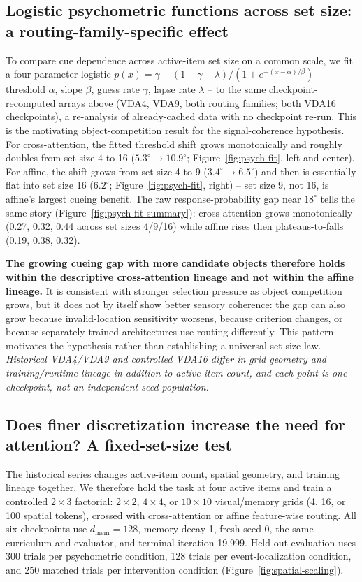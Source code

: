 \documentclass[10pt]{article}
\newcommand{\note}[1]{\textcolor{NoteGray}{\textit{#1}}}
\begin{document}
\subsection{Logistic psychometric functions across set size: a routing-family-specific effect}\label{sec:psychometric-fits}
To compare cue dependence across active-item set size on a common scale, we fit a four-parameter logistic $p(x)=\gamma+(1-\gamma-\lambda)/(1+e^{-(x-\alpha)/\beta})$ -- threshold $\alpha$, slope $\beta$, guess rate $\gamma$, lapse rate $\lambda$ -- to the same checkpoint-recomputed arrays above (VDA4, VDA9, both routing families; both VDA16 checkpoints), a re-analysis of already-cached data with no checkpoint re-run. This is the motivating object-competition result for the signal-coherence hypothesis. For cross-attention, the fitted threshold shift grows monotonically and roughly doubles from set size 4 to 16 ($5.3^\circ\to10.9^\circ$; Figure~\ref{fig:psych-fit}, left and center). For affine, the shift grows from set size 4 to 9 ($3.4^\circ\to6.5^\circ$) and then is essentially flat into set size 16 ($6.2^\circ$; Figure~\ref{fig:psych-fit}, right) -- set size 9, not 16, is affine's largest cueing benefit. The raw response-probability gap near $18^\circ$ tells the same story (Figure~\ref{fig:psych-fit-summary}): cross-attention grows monotonically (0.27, 0.32, 0.44 across set sizes 4/9/16) while affine rises then plateaus-to-falls (0.19, 0.38, 0.32).

\textbf{The growing cueing gap with more candidate objects therefore holds within the descriptive cross-attention lineage and not within the affine lineage.} It is consistent with stronger selection pressure as object competition grows, but it does not by itself show better sensory coherence: the gap can also grow because invalid-location sensitivity worsens, because criterion changes, or because separately trained architectures use routing differently. This pattern motivates the hypothesis rather than establishing a universal set-size law. \note{Historical VDA4/VDA9 and controlled VDA16 differ in grid geometry and training/runtime lineage in addition to active-item count, and each point is one checkpoint, not an independent-seed population.}

\subsection{Does finer discretization increase the need for attention? A fixed-set-size test}\label{sec:discretization-test}
The historical series changes active-item count, spatial geometry, and training lineage together. We therefore hold the task at four active items and train a controlled $2\times3$ factorial: $2\times2$, $4\times4$, or $10\times10$ visual/memory grids (4, 16, or 100 spatial tokens), crossed with cross-attention or affine feature-wise routing. All six checkpoints use $d_{\mathrm{mem}}=128$, memory decay 1, fresh seed 0, the same curriculum and evaluator, and terminal iteration 19{,}999. Held-out evaluation uses 300 trials per psychometric condition, 128 trials per event-localization condition, and 250 matched trials per intervention condition (Figure~\ref{fig:spatial-scaling}).
\end{document}
